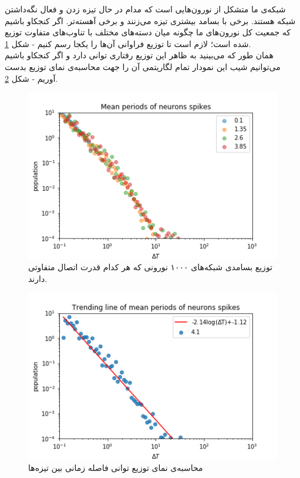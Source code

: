 \documentclass[12pt,onecolumn,a4paper]{article}
\begin{document}
شبکه‌ی ما متشکل از نورون‌هایی است که مدام در حال تیزه زدن و فعال نگه‌داشتن شبکه هستند. برخی با بسامد بیشتری تیزه می‌زنند و برخی آهسته‌تر. اگر کنجکاو باشیم که جمعیت کل نورون‌های ما چگونه میان دسته‌های مختلف با تناوب‌های متفاوت توزیع شده‌ است؛ لازم است تا توزیع فراوانی آن‌ها را یکجا رسم کنیم - شکل \ref{fig:if_isi}.\\
همان طور که می‌بینید به ظاهر این توزیع رفتاری توانی دارد و اگر کنجکاو باشیم می‌توانیم شیب این نمودار تمام لگاریتمی آن را جهت محاسبه‌ی نمای توزیع بدست آوریم - شکل \ref{fig:if_isi_trending_line}.
\begin{figure}[h]
\centering
  \includegraphics[width = 10 cm]{../papers_studies/figs/IF/mean_spiking_persiods.png}
 \caption{توزیع بسامدی شبکه‌های ۱۰۰۰ نورونی که هر کدام قدرت اتصال متفاوتی دارند. }
  \label{fig:if_isi}
\end{figure}

\begin{figure}[h]
\centering
  \includegraphics[width = 10 cm]{../papers_studies/figs/IF/mean_spiking_persiods_with_trending_line.png}
 \caption{محاسبه‌ی نمای توزیع توانی فاصله زمانی بین تیزه‌ها}
  \label{fig:if_isi_trending_line}
\end{figure}
\end{document}
